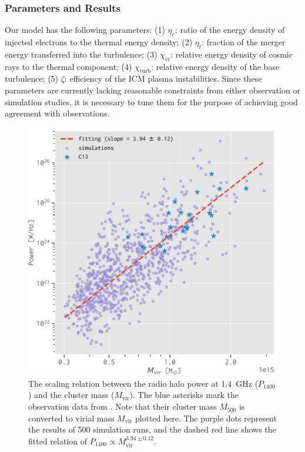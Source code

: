 \documentclass[twocolumn]{aastex62}
\newcommand{\R}[1]{\mathrm{#1}}
\newcommand{\editone}[1]{{\leavevmode\color{cyan}#1}}
\begin{document}
\subsubsection{\editone{Parameters and Results}}
\label{sec:halo-results}

Our model has the following parameters:
\editone{%
(1) $\eta_e$: ratio of the energy density of injected electrons to the
thermal energy density;
(2) $\eta_t$: fraction of the merger energy transferred into the
turbulence;
(3) $\chi_{\R{cr}}$: relative energy density of cosmic rays to the thermal
component;
(4) $\chi_{\R{turb}}$: relative energy density of the base turbulence;
(5) $\zeta$: efficiency of the ICM plasma instabilities.
Since these parameters are currently lacking reasonable constraints from
either observation or simulation studies, it is necessary to tune them for
the purpose of achieving good agreement with observations.} %

\begin{figure}
  \centering
  \includegraphics[width=\columnwidth]{halo-power-mvir}
  \caption{\label{fig:halo-power}\editone{%
    The scaling relation between the radio halo power at \SI{1.4}{\GHz}
    ($P_{1400}$) and the cluster mass ($M_{\R{vir}}$).
    The blue asterisks mark the observation data from \citet{cassano2013}.
    Note that their cluster mass $M_{500}$ is converted to virial mass
    $M_{\R{vir}}$ plotted here.
    The purple dots represent the results of 500 simulation runs, and the
    dashed red line shows the fitted relation of
    $P_{1400} \propto M_{\R{vir}}^{3.94 \pm 0.12}$.
  }}
\end{figure}
\end{document}
